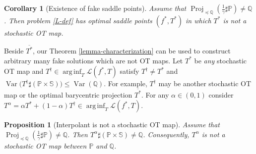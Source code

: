 \documentclass{article} %
\DeclareMathOperator*{\arginf}{arg\,inf}
\DeclareMathOperator{\Var}{Var}
\DeclareMathOperator{\Proj}{Proj}
\newtheorem{lemma}{Lemma}
\newtheorem{proposition}{Proposition}
\newtheorem{corollary}{Corollary}
\begin{document}
\begin{corollary}[Existence of fake saddle points]  Assume that $\Proj_{\preceq\mathbb{Q}}(\frac{1}{\gamma}\sharp\mathbb{P})\neq \mathbb{Q}$. Then problem \eqref{L-def} has optimal saddle points $(f^{*},T^{*})$ in which $T^{*}$ is not a stochastic OT map.
\label{corollary-existence-fake}
\vspace{-2mm}
\end{corollary}
Beside $\overline{T^{*}}$, our Theorem \ref{lemma-characterization} can be used to construct arbitrary many fake solutions which are not OT maps. Let $T^{*}$ be \textit{any} stochastic OT map and $T^{\dagger}\in\arginf_{T}\mathcal{L}(f^{*},T)$ satisfy $T^{\dagger}\neq T^{*}$ and $\Var\big(T^{\dagger}\sharp(\mathbb{P}\!\times\!\mathbb{S})\big)\leq \Var(\mathbb{Q})$. For example, $T^{\dagger}$ may be another stochastic OT map or the optimal barycentric projection $\overline{T^{*}}$. For any $\alpha\in (0,1)$ consider $T^{\alpha}=\alpha T^{*}+(1-\alpha)T^{\dagger}\in\arginf_{T}\mathcal{L}(f^{*},T)$.
\begin{proposition}[Interpolant is not a stochastic OT map] Assume that $\Proj_{\preceq\mathbb{Q}}(\frac{1}{\gamma}\sharp\mathbb{P})\neq \mathbb{Q}$. Then $T^{\alpha}\sharp(\mathbb{P}\times\mathbb{S})\neq \mathbb{Q}$. Consequently, $T^{\alpha}$ is not a stochastic OT map between $\mathbb{P}$ and $\mathbb{Q}$.
\label{prop-interpolant}
\vspace{-2mm}
\end{proposition}
\end{document}
